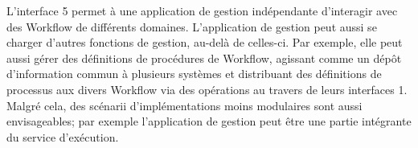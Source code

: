 L'interface 5 permet à une application de gestion indépendante d’interagir avec des
Workflow de différents domaines. L'application de gestion peut aussi se charger d'autres fonctions de gestion, au-delà de celles-ci. Par exemple, elle peut aussi gérer des définitions de procédures de Workflow, agissant comme un dépôt d’information commun à plusieurs systèmes
et distribuant des définitions de processus aux divers Workflow via des opérations au travers
de leurs interfaces 1.
Malgré cela, des scénarii d’implémentations moins modulaires sont aussi envisageables;
par exemple l'application de gestion peut être une partie intégrante du service d’exécution.  






% 
%
%
%
% 
%	
%		
%		
%		
%		
